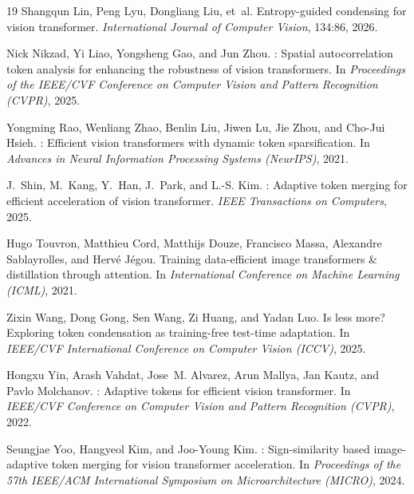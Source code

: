 \documentclass{article}
\begin{document}
\begin{thebibliography}{19}
Shangqun Lin, Peng Lyu, Dongliang Liu, et~al.
\newblock Entropy-guided condensing for vision transformer.
\newblock \emph{International Journal of Computer Vision}, 134:86, 2026.

Nick Nikzad, Yi Liao, Yongsheng Gao, and Jun Zhou.
: Spatial autocorrelation token analysis for enhancing the robustness of vision transformers.
\newblock In \emph{Proceedings of the IEEE/CVF Conference on Computer Vision and Pattern Recognition (CVPR)}, 2025.

Yongming Rao, Wenliang Zhao, Benlin Liu, Jiwen Lu, Jie Zhou, and Cho-Jui Hsieh.
: Efficient vision transformers with dynamic token sparsification.
\newblock In \emph{Advances in Neural Information Processing Systems (NeurIPS)}, 2021.

J.~Shin, M.~Kang, Y.~Han, J.~Park, and L.-S. Kim.
: Adaptive token merging for efficient acceleration of vision transformer.
\newblock \emph{IEEE Transactions on Computers}, 2025.

Hugo Touvron, Matthieu Cord, Matthijs Douze, Francisco Massa, Alexandre Sablayrolles, and Herv{\'e} J{\'e}gou.
\newblock Training data-efficient image transformers \& distillation through attention.
\newblock In \emph{International Conference on Machine Learning (ICML)}, 2021.

Zixin Wang, Dong Gong, Sen Wang, Zi Huang, and Yadan Luo.
\newblock Is less more? {E}xploring token condensation as training-free test-time adaptation.
\newblock In \emph{IEEE/CVF International Conference on Computer Vision (ICCV)}, 2025.

Hongxu Yin, Arash Vahdat, Jose~M. Alvarez, Arun Mallya, Jan Kautz, and Pavlo Molchanov.
: Adaptive tokens for efficient vision transformer.
\newblock In \emph{IEEE/CVF Conference on Computer Vision and Pattern Recognition (CVPR)}, 2022.

Seungjae Yoo, Hangyeol Kim, and Joo-Young Kim.
: Sign-similarity based image-adaptive token merging for vision transformer acceleration.
\newblock In \emph{Proceedings of the 57th IEEE/ACM International Symposium on Microarchitecture (MICRO)}, 2024.


\end{thebibliography}
\end{document}
